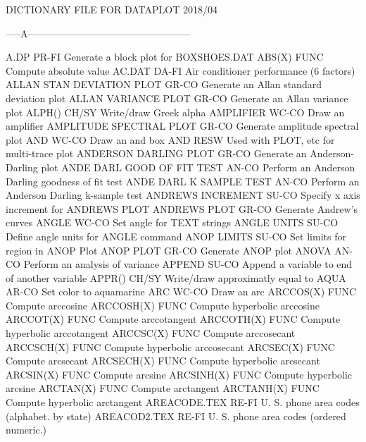                DICTIONARY FILE FOR DATAPLOT 2018/04

-----A--------------------------------------------------

A.DP                        PR-FI Generate a block plot for BOXSHOES.DAT
ABS(X)                      FUNC  Compute absolute value
AC.DAT                      DA-FI Air conditioner performance (6 factors)
ALLAN STAN DEVIATION PLOT   GR-CO Generate an Allan standard deviation plot
ALLAN VARIANCE PLOT         GR-CO Generate an Allan variance plot
ALPH()                      CH/SY Write/draw Greek alpha
AMPLIFIER                   WC-CO Draw an amplifier
AMPLITUDE SPECTRAL PLOT     GR-CO Generate amplitude spectral plot
AND                         WC-CO Draw an and box
AND                         RESW  Used with PLOT, etc for multi-trace plot
ANDERSON DARLING PLOT       GR-CO Generate an Anderson-Darling plot
ANDE DARL GOOD OF FIT TEST  AN-CO Perform an Anderson Darling goodness of fit test
ANDE DARL K SAMPLE TEST     AN-CO Perform an Anderson Darling k-sample test
ANDREWS INCREMENT           SU-CO Specify x axis increment for ANDREWS PLOT
ANDREWS PLOT                GR-CO Generate Andrew's curves
ANGLE                       WC-CO Set angle for TEXT strings
ANGLE UNITS                 SU-CO Define angle units for ANGLE command
ANOP LIMITS                 SU-CO Set limits for region in ANOP Plot
ANOP PLOT                   GR-CO Generate ANOP plot
ANOVA                       AN-CO Perform an analysis of variance
APPEND                      SU-CO Append a variable to end of another variable
APPR()                      CH/SY Write/draw approximatly equal to
AQUA                        AR-CO Set color to aquamarine
ARC                         WC-CO Draw an arc
ARCCOS(X)                   FUNC  Compute arccosine
ARCCOSH(X)                  FUNC  Compute hyperbolic arccosine
ARCCOT(X)                   FUNC  Compute arccotangent
ARCCOTH(X)                  FUNC  Compute hyperbolic arccotangent
ARCCSC(X)                   FUNC  Compute arccosecant
ARCCSCH(X)                  FUNC  Compute hyperbolic arccosecant
ARCSEC(X)                   FUNC  Compute arcsecant
ARCSECH(X)                  FUNC  Compute hyperbolic arcsecant
ARCSIN(X)                   FUNC  Compute arcsine
ARCSINH(X)                  FUNC  Compute hyperbolic arcsine
ARCTAN(X)                   FUNC  Compute arctangent
ARCTANH(X)                  FUNC  Compute hyperbolic arctangent
AREACODE.TEX                RE-FI U. S. phone area codes (alphabet. by state)
AREACOD2.TEX                RE-FI U. S. phone area codes (ordered numeric.)
